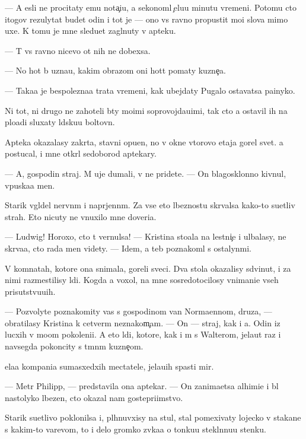 \documentclass[10pt]{book}
\begin{document}
— A {\y}esli ne procitaty {\y}emu nota{\c}i{\y}u, {\y}a sekonoml{\iu} {\c}elu{\y}u minutu vremeni. Potomu cto itogov{\yi}{\y} rezulytat budet odin i tot je — ono vs{\e} ravno propustit mo{\y}i slova mimo uxe{\y}. K tomu je mne sledu{\y}et zagl{\ia}nuty v apteku.

— T{\yi} vs{\e} ravno nicevo ot nih ne dob{\y}exsa.

— No hot{\ia} b{\yi} uzna{\y}u, kakim obrazom oni hot{\ia}t po{\y}maty kuzne{\c}a.

— Taka{\y}a je bespolezna{\y}a trata vremeni, kak ubejdaty Pugalo ostavatsa pa{\y}inyko{\y}.

Ni tot, ni drugo{\y} ne zahoteli b{\yi}ty mo{\y}imi soprovojda{\y}u{\x}imi, tak cto {\y}a ostavil ih na plo{\x}adi sluxaty l{\iu}dsku{\y}u boltovn{\iu}.

Apteka okazalasy zakr{\yi}ta, stavni opu{\x}en{\yi}, no v okne vtorovo etaja gorel svet. {\Y}a postucal, i mne otkr{\yi}l sedoborod{\yi}{\y} aptekary.

— A, gospodin straj. M{\yi} uje dumali, v{\yi} ne pridete. — On blagosklonno kivnul, vpuska{\y}a men{\ia}.

Starik v{\yi}gl{\ia}del nervn{\yi}m i napr{\ia}jenn{\yi}m. Za vse{\y} eto{\y} l{\iu}beznost{\y}u skr{\yi}valsa kako{\y}-to su{\y}etliv{\yi}{\y} strah. Eto nicuty ne vnuxilo mne doveri{\y}a.

— Ludwig! Horoxo, cto t{\yi} vernulsa! — Kristina sto{\y}ala na lestni{\c}e i ul{\yi}balasy, ne skr{\yi}va{\y}a, cto rada men{\ia} videty. — Idem, {\y}a teb{\ia} poznakoml{\iu} s ostalyn{\yi}mi.

V komnatah, kotor{\yi}{\y}e ona snimala, goreli sveci. Dva stola okazalisy sdvinut{\yi}, i za nimi razmestilisy l{\iu}di. Kogda {\y}a  voxol, na mne sosredotocilosy vnimani{\y}e vseh prisutstvu{\y}u{\x}ih.

— Pozvolyte poznakomity vas s gospodinom van Norma{\y}ennom, druz{\y}a, — obratilasy Kristina k cetver{\yi}m neznakom{\c}am. — On — straj, kak i {\y}a. Odin iz lucxih v mo{\y}om pokoleni{\y}i. A eto l{\iu}di, kotor{\yi}{\y}e, kak i m{\yi} s Walterom, jela{\y}ut raz i navsegda pokoncity s t{\e}mn{\yi}m kuzne{\c}om.

{\C}ela{\y}a kompani{\y}a sumasxedxih mectatele{\y}, jela{\y}u{\x}ih spasti mir.

— Metr Philipp, — predstavila ona aptekar{\ia}. — On zanima{\y}etsa alhimi{\y}e{\y} i b{\yi}l nastolyko l{\iu}bezen, cto okazal nam gostepri{\y}imstvo.

Starik su{\y}etlivo poklonilsa i, pl{\iu}hnuvxisy na stul, stal pomexivaty lojecko{\y} v stakane s kakim-to varevom, to i delo gromko zv{\ia}ka{\y}a o tonku{\y}u stekl{\ia}nnu{\y}u stenku.
\end{document}
